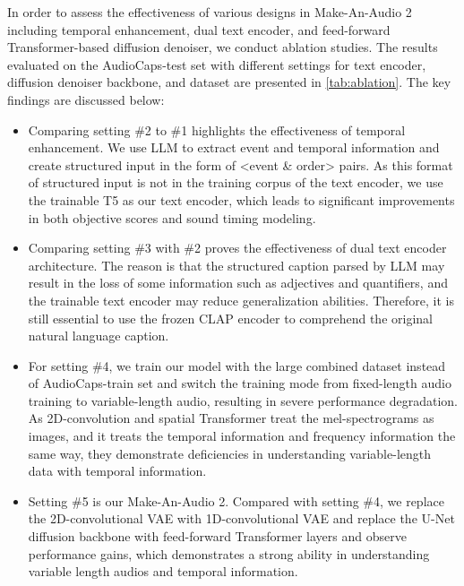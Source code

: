 \documentclass{article}
\begin{document}
In order to assess the effectiveness of various designs in Make-An-Audio 2 including temporal enhancement, dual text encoder, and feed-forward Transformer-based diffusion denoiser, we conduct ablation studies. The results evaluated on the AudioCaps-test set with different settings for text encoder, diffusion denoiser backbone, and dataset are presented in \autoref{tab:ablation}. The key findings are discussed below:
\begin{itemize}[leftmargin=*]
\item Comparing setting \#2 to \#1 highlights the effectiveness of temporal enhancement. We use LLM to extract event and temporal information and create structured input in the form of <event \& order> pairs. As this format of structured input is not in the training corpus of the text encoder, we use the trainable T5 as our text encoder, which leads to significant improvements in both objective scores and sound timing modeling.
    \item Comparing setting \#3 with \#2 proves the effectiveness of dual text encoder architecture. The reason is that the structured caption parsed by LLM may result in the loss of some information such as adjectives and quantifiers, and the trainable text encoder may reduce generalization abilities. Therefore, it is still essential to use the frozen CLAP encoder to comprehend the original natural language caption.
    \item For setting \#4, we train our model with the large combined dataset instead of AudioCaps-train set and switch the training mode from fixed-length audio training to variable-length audio, resulting in severe performance degradation. As 2D-convolution and spatial Transformer treat the mel-spectrograms as images, and it treats the temporal information and frequency information the same way, they demonstrate deficiencies in understanding variable-length data with temporal information. 
    \item Setting \#5 is our Make-An-Audio 2. Compared with setting \#4, we replace the 2D-convolutional VAE with 1D-convolutional VAE and replace the U-Net diffusion backbone with feed-forward Transformer layers and observe performance gains, which demonstrates a strong ability in understanding variable length audios and temporal information.
\end{itemize}
\end{document}

